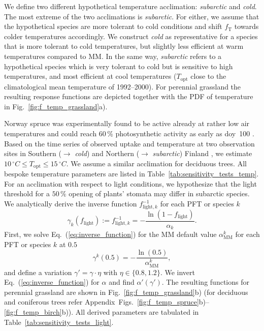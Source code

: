 \documentclass[bg, manuscript]{copernicus}
\begin{document}
We define two different hypothetical temperature acclimation: \emph{subarctic} and \emph{cold}. The most extreme of the two acclimations is \emph{subarctic}. For either, we assume that the hypothetical species are more tolerant to cold conditions and shift $f_\mathrm{T}$ towards colder temperatures accordingly. We construct \emph{cold} as representative for a species that is more tolerant to cold temperatures, but slightly less efficient at warm temperatures compared to MM. In the same way, \emph{subarctic} refers to a hypothetical species which is very tolerant to cold but is sensitive to high temperatures, and most efficient at cool temperatures ($T_\mathrm{opt}$ close to the climatological mean temperature of 1992--2000). For perennial grassland the resulting response functions are depicted together with the PDF of temperature in Fig.~\ref{fig:f_temp_grassland}a).

Norway spruce was experimentally found to be active already at rather low air temperatures and could reach $60\,\unit{\%}$ photosynthetic activity as early as \unit{doy}~100 \citep{TB:Kolari2007, TP:Wallin2013}. Based on the time series of observed  uptake and temperature at two observation sites in Southern ($\rightarrow$ \emph{cold}) and Northern ($\rightarrow$ \emph{subarctic}) Finland \citep{TB:Kolari2007}, we estimate $10\,\unit{^\circ C}\le T_\mathrm{opt} \le 15\,\unit{^\circ C}$. We assume a similar acclimation for deciduous trees. All bespoke temperature parameters are listed in Table~\ref{tab:sensitivity_tests_temp}.\\

For an acclimation with respect to light conditions, we hypothesize that the light threshold for a $50\,\unit{\%}$ opening of plants' stomata may differ in subarctic species. We analytically derive the inverse function $f_{\mathrm{light},k}^{-1}$ for each PFT or species $k$
\begin{equation}
  \gamma_k(f_\mathrm{light}) := f_{\mathrm{light}, k}^{-1} = -\frac{\ln(1-f_\mathrm{light})}{\alpha_k}.
  \label{eq:inverse_function}
\end{equation}
First, we solve Eq.~(\ref{eq:inverse_function}) for the MM default value $\alpha_\mathrm{MM}^k$ for each PFT or species $k$ at $0.5$ 
\begin{equation}
  \gamma^k(0.5) = -\frac{\ln(0.5)}{\alpha_\mathrm{MM}^k},
  \label{eq:inverse_function_halfway}
\end{equation}
and define a variation $\gamma' = \gamma \cdot \eta$ with $\eta \in \{0.8, 1.2\}$. We invert Eq.~(\ref{eq:inverse_function}) for $\alpha$ and find $\alpha'(\gamma')$. The resulting functions for perennial grassland are shown in Fig.~\ref{fig:f_temp_grassland}b) (for deciduous and coniferous trees refer Appendix~Figs.~\ref{fig:f_temp_spruce}b)--\ref{fig:f_temp_birch}b)). All derived parameters are tabulated in Table~\ref{tab:sensitivity_tests_light}.
\end{document}

